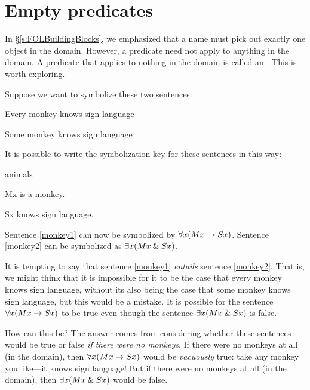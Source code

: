 \section{Empty predicates}

In \S\ref{s:FOLBuildingBlocks}, we emphasized that a name must pick out exactly one object in the domain. However, a predicate need not apply to anything in the domain. A predicate that applies to nothing in the domain is called an . This is worth exploring.


Suppose we want to symbolize these two sentences:
	\begin{earg}
		\item[\ex{monkey1}] Every monkey knows sign language
		\item[\ex{monkey2}] Some monkey knows sign language
	\end{earg}
It is possible to write the symbolization key for these sentences in this way:
	\begin{ekey}
		\item[\text{domain}] animals
		\item[Mx]  is a monkey.
		\item[Sx]  knows sign language.
	\end{ekey}
Sentence \ref{monkey1} can now be symbolized by $\forall x(Mx \rightarrow Sx)$. Sentence \ref{monkey2} can be symbolized as $\exists x(Mx \mathbin{\&} Sx)$.

It is tempting to say that sentence \ref{monkey1} \emph{entails} sentence \ref{monkey2}. That is, we might think that it is impossible for it to be the case that every monkey knows sign language, without its also being the case that some monkey knows sign language, but this would be a mistake. It is possible for the sentence $\forall x(Mx \rightarrow Sx)$ to be true even though the sentence $\exists x(Mx \mathbin{\&} Sx)$ is false.

How can this be? The answer comes from considering whether these sentences would be true or false \emph{if there were no monkeys}. If there were no monkeys at all (in the domain), then $\forall x(Mx \rightarrow Sx)$ would be \emph{vacuously} true: take any monkey you like---it knows sign language! But if there were no monkeys at all (in the domain), then $\exists x(Mx \mathbin{\&} Sx)$ would be false.


